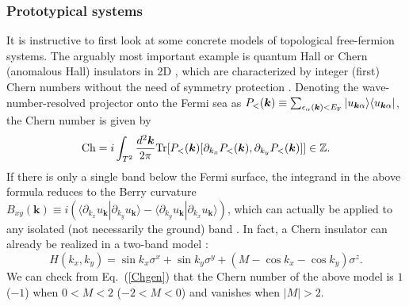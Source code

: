 \documentclass{tADP2e}
\theoremstyle{plain}
\theoremstyle{plain}
\theoremstyle{definition}
\begin{document}
\subsubsection{Prototypical systems}\label{ProSys}
It is instructive to first look at some concrete models of topological free-fermion systems. The arguably most important example is quantum Hall or Chern (anomalous Hall) insulators in 2D \cite{KKv80}, which are characterized by integer (first) Chern numbers without the need of symmetry protection \cite{TDJ82}. Denoting the wave-number-resolved projector onto the Fermi sea as $P_<(\boldsymbol{k})\equiv\sum_{\epsilon_\alpha(\boldsymbol{k})<E_{\rm F}}|u_{\boldsymbol{k}\alpha}\rangle\langle u_{\boldsymbol{k}\alpha}|$, the Chern number is given by \cite{CCK16}
\begin{equation}
{\rm Ch}=i\int_{T^2}\frac{d^2\boldsymbol{k}}{2\pi }{\rm Tr}[P_<(\boldsymbol{k})[\partial_{k_x}P_<(\boldsymbol{k}),\partial_{k_y}P_<(\boldsymbol{k})]]\in\mathbb{Z}.
\label{Chgen}
\end{equation}
If there is only a single band below the Fermi surface, the integrand in the above formula reduces to the Berry curvature $B_{xy}(\boldsymbol{k})\equiv i(\langle\partial_{k_x}u_{\boldsymbol{k}}|\partial_{k_y}u_{\boldsymbol{k}}\rangle-\langle\partial_{k_y}u_{\boldsymbol{k}}|\partial_{k_x}u_{\boldsymbol{k}}\rangle)$, 
which can actually be applied to any isolated (not necessarily the ground) band \cite{XD10}. In fact, a Chern insulator can already be realized in a two-band model \cite{BAB13}:
\begin{equation}
H(k_x,k_y)=\sin k_x\sigma^x+\sin k_y\sigma^y+(M-\cos k_x-\cos k_y)\sigma^z.
\label{ChH}
\end{equation} 
 We can check from Eq.~(\ref{Chgen}) that the Chern number of the above model is $1$ ($-1$) when $0<M<2$ ($-2<M<0$) and vanishes when $|M|>2$. 
 
\end{document}
